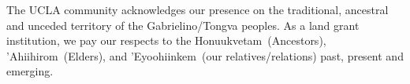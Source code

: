 
\vspace*{\fill}
\begin{center}
    \begin{minipage}{\linewidth}
        The UCLA community acknowledges our presence on the traditional, ancestral and unceded territory of the Gabrielino/Tongva peoples.
        As a land grant institution, we pay our respects to the Honuukvetam~(Ancestors), 'Ahiihirom~(Elders), and 'Eyoohiinkem~(our relatives/relations) past, present and emerging.
    \end{minipage}
\end{center}
\vspace*{\fill}
